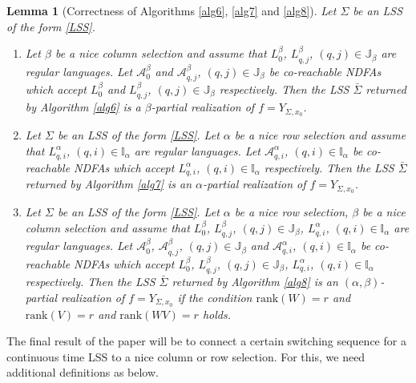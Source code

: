 \documentclass[journal]{IEEEtran}
\newcommand{\Rank}{\mathrm{rank}}
\newtheorem{Lemma}{Lemma}
\begin{document}
\begin{Lemma} [Correctness of Algorithms \ref{alg6}, \ref{alg7} and \ref{alg8}]
	Let $\Sigma$ be an LSS of the form \eqref{LSS}.
	\begin{enumerate}
		\item  Let $\beta$ be a nice column selection and assume that $L^\beta_0$, $L^{\beta}_{q,j}$, $(q,j) \in \mathbb{J}_\beta$ are regular languages. Let $\mathcal{A}^\beta_0$ and $\mathcal{A}^\beta_{q,j}$, $(q,j) \in \mathbb{J}_\beta$ be co-reachable NDFAs which accept $L^\beta_0$ and $L^{\beta}_{q,j}$, $(q,j) \in \mathbb{J}_\beta$ respectively. Then the LSS $\bar{\Sigma}$ returned by Algorithm \ref{alg6} is a $\beta$-partial realization of $f=Y_{\Sigma,x_0}$.
		
		\item Let $\Sigma$ be an LSS of the form \eqref{LSS}. Let $\alpha$ be a nice row selection and assume that $L^{\alpha}_{q,i}$, $(q,i) \in \mathbb{I}_\alpha$ are regular languages. Let $\mathcal{A}^\alpha_{q,i}$, $(q,i) \in \mathbb{I}_\alpha$ be co-reachable NDFAs which accept $L^{\alpha}_{q,i}$, $(q,i) \in \mathbb{I}_\alpha$ respectively. Then the LSS $\bar{\Sigma}$ returned by Algorithm \ref{alg7} is an $\alpha$-partial realization of $f=Y_{\Sigma,x_0}$.
		
		\item Let $\Sigma$ be an LSS of the form \eqref{LSS}. Let $\alpha$ be a nice row selection, $\beta$ be a nice column selection and assume that $L^\beta_0$, $L^{\beta}_{q,j}$, $(q,j) \in \mathbb{J}_\beta$, $L^{\alpha}_{q,i}$, $(q,i) \in \mathbb{I}_\alpha$ are regular languages. Let $\mathcal{A}^\beta_0$, $\mathcal{A}^\beta_{q,j}$, $(q,j) \in \mathbb{J}_\beta$ and $\mathcal{A}^\alpha_{q,i}$, $(q,i) \in \mathbb{I}_\alpha$ be co-reachable NDFAs which accept $L^\beta_0$, $L^{\beta}_{q,j}$, $(q,j) \in \mathbb{J}_\beta$, $L^{\alpha}_{q,i}$, $(q,i) \in \mathbb{I}_\alpha$ respectively. Then the LSS $\bar{\Sigma}$ returned by Algorithm \ref{alg8} is an $(\alpha,\beta)$-partial realization of $f=Y_{\Sigma,x_0}$ if the condition $\Rank(W)=r$ and $\Rank(V)=r$ and $\Rank(WV)=r$ holds.
	\end{enumerate}
\end{Lemma}





The final result of the paper will be to connect a certain switching sequence for a continuous time LSS to a nice column or row selection. For this, we need additional definitions as below.
\end{document}
